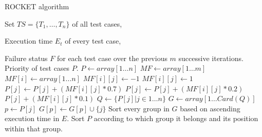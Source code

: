 \begin{algorithm}[h!]
\caption{ROCKET algorithm}
\label{alg:rocket}
\begin{algorithmic}[1]
	 Set $TS = \{T_1, \dots, T_n\}$ of all test cases,

	Execution time $E_t$ of every test case,
	
	Failure status $F$ for each test case over the previous $m$ successive iterations.
	 Priority of test cases $P$.
	\State $P \gets array[1 \dots n]$ 
	\State $MF \gets array[1 \dots m]$
		\State $MF[i] \gets array[1 \dots n]$
			 $MF[i][j] \gets -1$
			\Else{} $MF[i][j] \gets 1$
			\EndIf
		\EndFor
	\EndFor
			 $P[j] \gets P[j] + (MF[i][j] * 0.7)$
			 $P[j] \gets P[j] + (MF[i][j] * 0.2)$
			\Else{} $P[j] + (MF[i][j] * 0.1)$
			\EndIf
		\EndFor
	\EndFor
	\State $Q \gets \{P[j] \vert j \in 1 \dots n\}$ 
	\State $G \gets array[1 \dots Card(Q)]$ 
		\State $p \gets P[j]$
		\State $G[p] \gets G[p] \cup \{j\}$
	\EndFor
	\State Sort every group in $G$ based on ascending execution time in $E$.
	\State Sort $P$ according to which group it belongs and its position within that group.
\end{algorithmic}
\end{algorithm}
